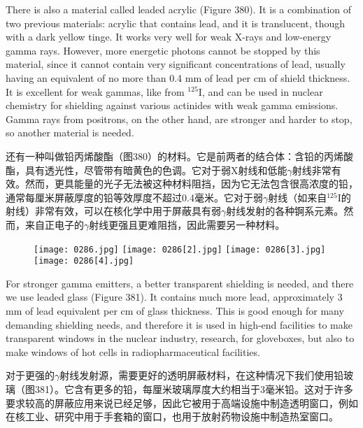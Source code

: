 \documentclass[dvipsnames, svgnames,a4paper,11pt]{article}
\begin{document}
There is also a material called leaded acrylic (Figure 380). It is a combination of two previous materials: acrylic that contains lead, and it is translucent, though with a dark yellow tinge. It works very well for weak X-rays and low-energy gamma rays. However, more energetic photons cannot be stopped by this material, since it cannot contain very significant concentrations of lead, usually having an equivalent of no more than 0.4 mm of lead per cm of shield thickness. It is excellent for weak gammas, like from \(\mathrm{^{125}I}\), and can be used in nuclear chemistry for shielding against various actinides with weak gamma emissions. Gamma rays from positrons, on the other hand, are stronger and harder to stop, so another material is needed.

还有一种叫做铅丙烯酸酯（图380）的材料。它是前两者的结合体：含铅的丙烯酸酯，具有透光性，尽管带有暗黄色的色调。它对于弱X射线和低能$\gamma$射线非常有效。然而，更具能量的光子无法被这种材料阻挡，因为它无法包含很高浓度的铅，通常每厘米屏蔽厚度的铅等效厚度不超过0.4毫米。它对于弱$\gamma$射线（如来自\(\mathrm{^{125}I}\)的射线）非常有效，可以在核化学中用于屏蔽具有弱$\gamma$射线发射的各种锕系元素。然而，来自正电子的$\gamma$射线更强且更难阻挡，因此需要另一种材料。

\begin{figure}[h]
    \centering
    \texttt{[image: 0286.jpg]} \hspace{0.1in}
    \texttt{[image: 0286[2].jpg]} \hspace{0.1in}
    \texttt{[image: 0286[3].jpg]}  \hspace{0.1in}
    \texttt{[image: 0286[4].jpg]}  
     \label{fig380}
\end{figure}

For stronger gamma emitters, a better transparent shielding is needed, and there we use leaded glass (Figure 381). It contains much more lead, approximately 3 mm of lead equivalent per cm of glass thickness. This is good enough for many demanding shielding needs, and therefore it is used in high-end facilities to make transparent windows in the nuclear industry, research, for gloveboxes, but also to make windows of hot cells in radiopharmaceutical facilities.

对于更强的$\gamma$射线发射源，需要更好的透明屏蔽材料，在这种情况下我们使用铅玻璃（图381）。它含有更多的铅，每厘米玻璃厚度大约相当于3毫米铅。这对于许多要求较高的屏蔽应用来说已经足够，因此它被用于高端设施中制造透明窗口，例如在核工业、研究中用于手套箱的窗口，也用于放射药物设施中制造热室窗口。
\end{document}

